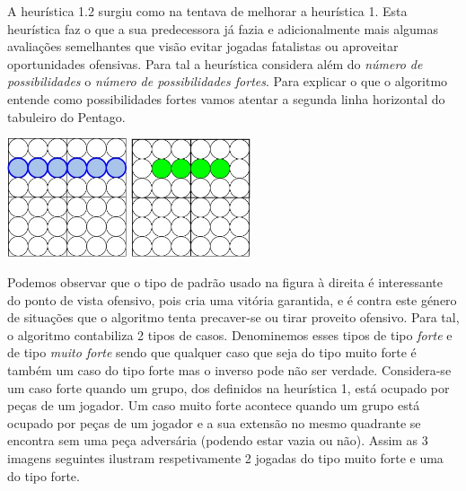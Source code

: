 
A heurística 1.2 surgiu como na tentava de melhorar a heurística 1. Esta heurística faz o que a sua predecessora já fazia e adicionalmente mais algumas avaliações semelhantes que visão evitar jogadas fatalistas ou aproveitar oportunidades ofensivas. Para tal a heurística considera além do \emph{número de possibilidades} o \emph{número de possibilidades fortes}. 
Para explicar o que o algoritmo entende como possibilidades fortes vamos atentar a segunda linha horizontal do tabuleiro do Pentago. 

\begin{table}[H]
\centering
\includegraphics[height=3.5cm]{images/h12_hline.jpg}
\includegraphics[height=3.5cm]{images/h12_fatal.jpg}
\end{table}

Podemos observar que o tipo de padrão usado na figura à direita é interessante do ponto de vista ofensivo, pois cria uma vitória garantida, e é contra este género de situações que o algoritmo tenta precaver-se ou tirar proveito ofensivo.
Para tal, o algoritmo contabiliza 2 tipos de casos. Denominemos esses tipos de tipo \emph{forte} e de tipo \emph{muito forte} sendo que qualquer caso que seja do tipo muito forte é também um caso do tipo forte mas o inverso pode não ser verdade. Considera-se um caso forte quando um grupo, dos definidos na heurística 1, está ocupado por peças de um jogador. Um caso muito forte acontece quando um grupo está ocupado por peças de um jogador e a sua extensão no mesmo quadrante se encontra sem uma peça adversária (podendo estar vazia ou não). Assim as 3 imagens seguintes ilustram respetivamente 2 jogadas do tipo muito forte e uma do tipo forte.

